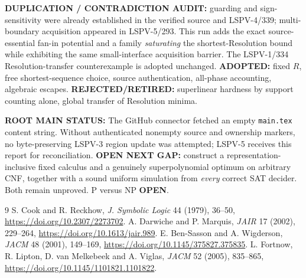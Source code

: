 \documentclass[11pt]{article}
\begin{document}
\noindent\textbf{DUPLICATION / CONTRADICTION AUDIT:} guarding and sign-sensitivity were already established in the verified source and LSPV-4/339; multi-boundary acquisition appeared in LSPV-5/293. This run adds the exact source-essential fan-in potential and a family \emph{saturating} the shortest-Resolution bound while exhibiting the same small-interface acquisition barrier. The LSPV-1/334 Resolution-transfer counterexample is adopted unchanged. \textbf{ADOPTED:} fixed $R$, free shortest-sequence choice, source authentication, all-phase accounting, algebraic escapes. \textbf{REJECTED/RETIRED:} superlinear hardness by support counting alone, global transfer of Resolution minima.

\noindent\textbf{ROOT MAIN STATUS:} The GitHub connector fetched an empty \texttt{main.tex} content string. Without authenticated nonempty source and ownership markers, no byte-preserving LSPV-3 region update was attempted; LSPV-5 receives this report for reconciliation. \textbf{OPEN NEXT GAP:} construct a representation-inclusive fixed calculus and a genuinely superpolynomial optimum on arbitrary CNF, together with a sound uniform simulation from \emph{every} correct SAT decider. Both remain unproved. P versus NP \textbf{OPEN}.

\begin{thebibliography}{9}
 S. Cook and R. Reckhow, \emph{J. Symbolic Logic} 44 (1979), 36--50, \url{https://doi.org/10.2307/2273702}.
 A. Darwiche and P. Marquis, \emph{JAIR} 17 (2002), 229--264, \url{https://doi.org/10.1613/jair.989}.
 E. Ben-Sasson and A. Wigderson, \emph{JACM} 48 (2001), 149--169, \url{https://doi.org/10.1145/375827.375835}.
 L. Fortnow, R. Lipton, D. van Melkebeek and A. Viglas, \emph{JACM} 52 (2005), 835--865, \url{https://doi.org/10.1145/1101821.1101822}.
\end{thebibliography}
\end{document}
